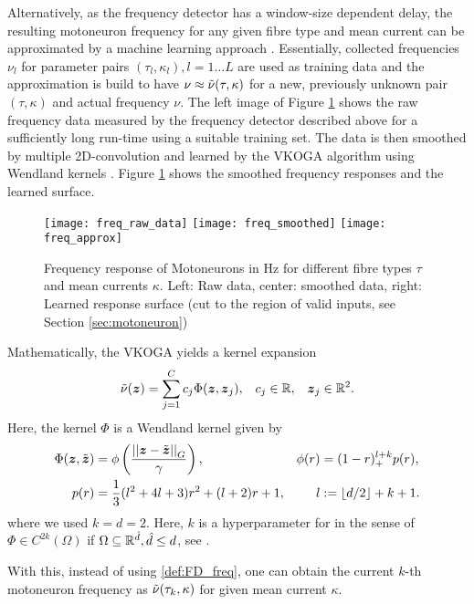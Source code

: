 Alternatively, as the frequency detector has a window-size dependent delay, the resulting motoneuron frequency for any given fibre type and 
mean current can be approximated by a machine learning approach \cite{Wirtz2013a}.
Essentially, collected frequencies $\nu_l$ for parameter pairs $(\tau_l,\kappa_l), l = 1\ldots L$ are used as training data
and the approximation is build to have $\nu \approx \tilde{\nu}(\tau,\kappa)$ for a new, previously unknown pair $(\tau,\kappa)$ and actual frequency $\nu$.
The left image of Figure \ref{fig:motofreq} shows the raw frequency data measured by the frequency detector described above for a sufficiently long run-time using a suitable training set.
The data is then smoothed by multiple 2D-convolution and learned by the VKOGA algorithm using Wendland kernels \cite{Wirtz2013a, Wirtz2013, Wendland2005}.
Figure \ref{fig:motofreq} shows the smoothed frequency responses and the learned surface.
\begin{figure}[!ht]
	\centering
	\texttt{[image: freq\_raw\_data]}
	\texttt{[image: freq\_smoothed]}
	\texttt{[image: freq\_approx]}
	\caption{Frequency response of Motoneurons in Hz for different fibre types $\tau$ and mean currents $\kappa$.
	Left: Raw data, center: smoothed data, right: Learned response surface (cut to the region of valid inputs, see Section \ref{sec:motoneuron})}
	\label{fig:motofreq}
\end{figure}
Mathematically, the VKOGA yields a kernel expansion
\begin{align}
	\tilde{\nu}(\boldsymbol{z}) &= \sum\limits_{j=1}^{C}c_j\Phi(\boldsymbol{z},\boldsymbol{z}_j), & c_j &\in \mathbb{R},  & \boldsymbol{z}_j\in\mathbb{R}^2. 
\end{align}
Here, the kernel $\Phi$ is a Wendland kernel given by
\begin{align}
	\Phi(\boldsymbol{z},\tilde{\boldsymbol{z}}) &= \phi\left(\frac{\left|\left|\boldsymbol{z}-\tilde{\boldsymbol{z}}\right|\right|_{G}}{\gamma}\right), & \phi(r) &= (1-r)^{l+k}_+p(r),\\
	p(r) &= \frac{1}{3}(l^2 + 4l + 3)r^2 + (l + 2)r + 1, & l &:= \lfloor d/2\rfloor + k + 1.
\end{align}
where we used $k=d=2$.
Here, $k$ is a hyperparameter for  in the sense of $\Phi\in C^{2k}(\Omega)$ if $\Omega \subseteq \mathbb{R}^{\hat{d}}, \hat{d}\leq d$, see \cite{Wendland2005}.

With this, instead of using \eqref{def:FD_freq}, one can obtain the current $k$-th motoneuron frequency as $\tilde{\nu}(\tau_k,\kappa)$ for given mean current $\kappa$.


